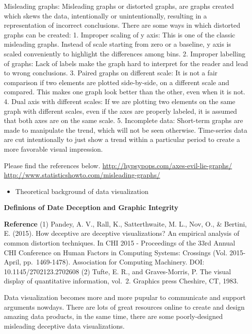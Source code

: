 \documentclass[]{book}
\providecommand{\tightlist}{%
  \setlength{\itemsep}{0pt}\setlength{\parskip}{0pt}}
\theoremstyle{definition}
\theoremstyle{definition}
\theoremstyle{definition}
\theoremstyle{remark}
\begin{document}
Misleading graphs: Misleading graphs or distorted graphs, are graphs
created which skews the data, intentionally or unintentionally,
resulting in a representation of incorrect conclusions. There are some
ways in which distorted graphs can be created: 1. Improper scaling of y
axis: This is one of the classic misleading graphs. Instead of scale
starting from zero or a baseline, y axis is scaled conveniently to
highlight the differences among bins. 2. Improper labelling of graphs:
Lack of labels make the graph hard to interpret for the reader and lead
to wrong conclusions. 3. Paired graphs on different scale: It is not a
fair comparison if two elements are plotted side-by-side, on a different
scale and compared. This makes one graph look better than the other,
even when it is not. 4. Dual axis with different scales: If we are
plotting two elements on the same graph with different scales, even if
the axes are properly labeled, it is assumed that both axes are on the
same scale. 5. Incomplete data: Short-term graphs are made to manipulate
the trend, which will not be seen otherwise. Time-series data are cut
intentionally to just show a trend within a particular period to create
a more favorable visual impression.

Please find the references below.
\url{http://hypsypops.com/axes-evil-lie-graphs/}
\url{http://www.statisticshowto.com/misleading-graphs/}

\begin{itemize}
\tightlist
\item
  Theoretical background of data visualization
\end{itemize}

\textbf{Definions of Date Deception and Graphic Integrity}

\textbf{Reference} (1) Pandey, A. V., Rall, K., Satterthwaite, M. L.,
Nov, O., \& Bertini, E. (2015). How deceptive are deceptive
visualizations? An empirical analysis of common distortion techniques.
In CHI 2015 - Proceedings of the 33rd Annual CHI Conference on Human
Factors in Computing Systems: Crossings (Vol. 2015-April,
pp.~1469-1478). Association for Computing Machinery. DOI:
10.1145/2702123.2702608 (2) Tufte, E. R., and Graves-Morris, P. The
visual display of quantitative information, vol.~2. Graphics press
Cheshire, CT, 1983.

Data visualization becomes more and more pupular to communicate and
support arguments nowdays. There are lots of great resources online to
create and design amazing data products, in the same time, there are
some poorly-designed misleading deceptive data visualizations.
\end{document}
